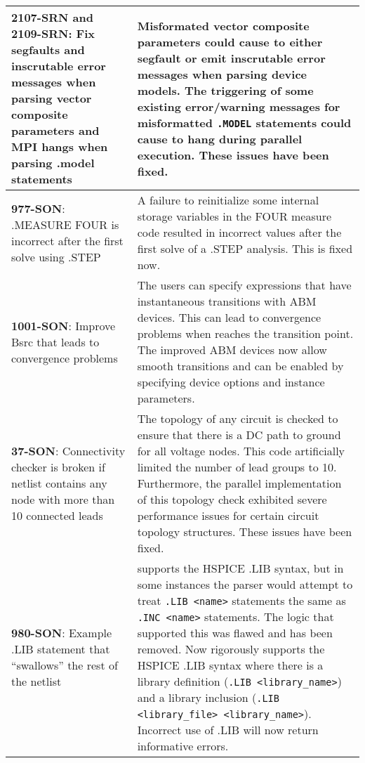 {\begin{longtable}[h] {>{\raggedright\small}m{2in}|>{\raggedright\let\\\tabularnewline\small}m{3.5in}}
     \textbf{2107-SRN and 2109-SRN}: Fix segfaults and inscrutable error messages when 
     parsing vector composite parameters and MPI hangs when parsing .model statements & 
     Misformated vector composite parameters could cause \Xyce{} to either segfault or emit 
     inscrutable error messages when parsing device models.  The triggering of some existing \Xyce{} 
     error/warning messages for misformatted \texttt{.MODEL} statements could cause \Xyce{} 
     to hang during parallel execution.  These issues have been fixed.
     \\ \hline

     \textbf{977-SON}: .MEASURE FOUR is incorrect after the first solve using .STEP &
     A failure to reinitialize some internal storage variables in the FOUR measure code resulted in
     incorrect values after the first solve of a .STEP analysis.  This is fixed now.
     \\ \hline


     \textbf{1001-SON}: Improve Bsrc that leads to convergence problems  &
     The users can specify expressions that have instantaneous transitions with ABM devices. This can 
     lead to convergence problems when \Xyce{} reaches the transition point. The improved ABM devices 
     now allow smooth transitions and can be enabled by specifying device options and instance parameters.
     \\ \hline

     \textbf{37-SON}: Connectivity checker is broken if netlist contains any node with 
     more than 10 connected leads & The topology of any circuit is checked to ensure that
     there is a DC path to ground for all voltage nodes.  This code artificially limited
     the number of lead groups to 10.  Furthermore, the parallel implementation of this
     topology check exhibited severe performance issues for certain circuit topology structures.
     These issues have been fixed.
     \\ \hline

     \textbf{980-SON}: Example .LIB statement that ``swallows'' the rest of the \Xyce{} netlist
     & \Xyce{} supports the HSPICE .LIB syntax, but in some instances the parser would attempt
     to treat \texttt{.LIB <name>} statements the same as \texttt{.INC <name>} statements.
     The logic that supported this was
     flawed and has been removed.  Now \Xyce{} rigorously supports the HSPICE .LIB syntax
     where there is a library definition (\texttt{.LIB <library\_name>}) and a library inclusion
     (\texttt{.LIB <library\_file> <library\_name>}).  Incorrect use of .LIB will now return informative errors.
     \\ \hline


\end{longtable}}
